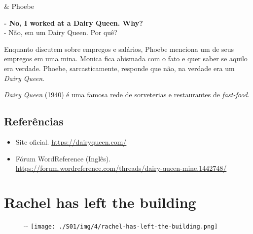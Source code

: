 \begin{tcolorbox}[enhanced,center upper,
    drop fuzzy shadow southeast, boxrule=0.3pt,
    lower separated=false, breakable,
    colframe=black!30!dialogoBorder,colback=white]
\medskip
\begin{minipage}[c]{0.16\linewidth}
   & \centering \scriptsize{Phoebe}
\end{minipage}
\hfill
\begin{minipage}[c]{0.8\linewidth}
  \textbf{- No, I worked at a Dairy Queen. Why?}\\
  - Não, em um Dairy Queen. Por quê?
\end{minipage}
\end{tcolorbox}

Enquanto discutem sobre empregos e salários, Phoebe menciona um de seus
empregos em uma mina. Monica fica abismada com o fato e quer saber se
aquilo era verdade. Phoebe, sarcasticamente, responde que não, na
verdade era um \emph{Dairy Queen}.

\emph{Dairy Queen} (1940) é uma famosa rede de sorveterias e
restaurantes de \emph{fast-food}.

\hypertarget{referuxeancias}{%
\subsection{Referências}\label{referuxeancias}}

\begin{itemize}
\tightlist
\item
  \sloppy Site oficial. \url{https://dairyqueen.com/}
\item
  \sloppy Fórum WordReference (Inglês). \url{https://forum.wordreference.com/threads/dairy-queen-mine.1442748/}
\end{itemize}

\hypertarget{rachel-has-left-the-building}{%
\section{Rachel has left the
building}\label{rachel-has-left-the-building}}

\begin{figure}[!ht]
  \begin{adjustwidth}{-\oddsidemargin-1in}{-\rightmargin}
    \centering
    \texttt{[image: ./S01/img/4/rachel-has-left-the-building.png]}
  \end{adjustwidth}
\end{figure}

